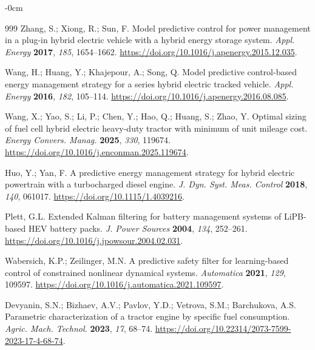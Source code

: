 \documentclass[energies,article,submit,moreauthors]{Definitions/mdpi}
\begin{document}
\begin{adjustwidth}{-\extralength}{0cm}
\begin{thebibliography}{999}
 Zhang, S.; Xiong, R.; Sun, F. Model predictive control for power management in a plug-in hybrid electric vehicle with a hybrid energy storage system. \emph{Appl. Energy} \textbf{2017}, \emph{185}, 1654--1662. \url{https://doi.org/10.1016/j.apenergy.2015.12.035}.

 Wang, H.; Huang, Y.; Khajepour, A.; Song, Q. Model predictive control-based energy management strategy for a series hybrid electric tracked vehicle. \emph{Appl. Energy} \textbf{2016}, \emph{182}, 105--114. \url{https://doi.org/10.1016/j.apenergy.2016.08.085}.

 Wang, X.; Yao, S.; Li, P.; Chen, Y.; Hao, Q.; Huang, S.; Zhao, Y. Optimal sizing of fuel cell hybrid electric heavy-duty tractor with minimum of unit mileage cost. \emph{Energy Convers. Manag.} \textbf{2025}, \emph{330}, 119674. \url{https://doi.org/10.1016/j.enconman.2025.119674}.

 Huo, Y.; Yan, F. A predictive energy management strategy for hybrid electric powertrain with a turbocharged diesel engine. \emph{J. Dyn. Syst. Meas. Control} \textbf{2018}, \emph{140}, 061017. \url{https://doi.org/10.1115/1.4039216}.

 Plett, G.L. Extended Kalman filtering for battery management systems of LiPB-based HEV battery packs. \emph{J. Power Sources} \textbf{2004}, \emph{134}, 252--261. \url{https://doi.org/10.1016/j.jpowsour.2004.02.031}.

 Wabersich, K.P.; Zeilinger, M.N. A predictive safety filter for learning-based control of constrained nonlinear dynamical systems. \emph{Automatica} \textbf{2021}, \emph{129}, 109597. \url{https://doi.org/10.1016/j.automatica.2021.109597}.

 Devyanin, S.N.; Bizhaev, A.V.; Pavlov, Y.D.; Vetrova, S.M.; Barchukova, A.S. Parametric characterization of a tractor engine by specific fuel consumption. \emph{Agric. Mach. Technol.} \textbf{2023}, \emph{17}, 68--74. \url{https://doi.org/10.22314/2073-7599-2023-17-4-68-74}.
\end{thebibliography}
\PublishersNote{}
\end{adjustwidth}
\end{document}
